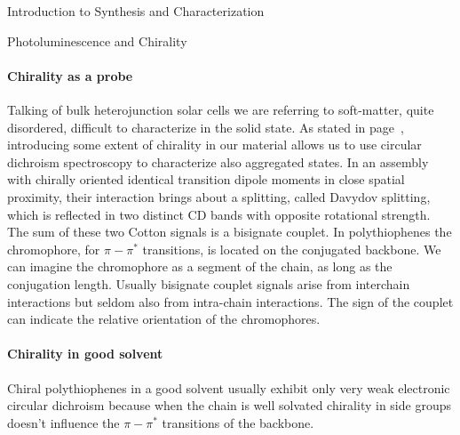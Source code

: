 \begin{section}{Introduction to Synthesis and Characterization}
\begin{subsection}{Photoluminescence and Chirality}
\paragraph{Chirality as a probe} Talking of bulk heterojunction solar cells we are referring to soft-matter, quite disordered, difficult to characterize in the solid state. As stated in page~\pageref{intro-cd}, introducing some extent of chirality in our material allows us to use circular dichroism spectroscopy to characterize also aggregated states. 
In an assembly with chirally oriented identical transition dipole moments in close spatial proximity, their interaction brings about a splitting, called Davydov splitting, %
which is reflected in two distinct \gls{CD} bands 
with opposite rotational strength. 
The sum of these two Cotton signals 
is a bisignate couplet. 
In polythiophenes the chromophore, for $\pi-\pi^*$ transitions, is located on the conjugated backbone. We can imagine the chromophore as a segment of the chain, as long as the conjugation length. Usually bisignate couplet signals arise from interchain interactions but seldom also from intra-chain interactions. The sign of the couplet can indicate the relative orientation of the chromophores. 

\paragraph{Chirality in good solvent} Chiral polythiophenes in a good solvent usually exhibit only very weak electronic circular dichroism because when the chain is well solvated chirality in side groups doesn't influence the $\pi-\pi^*$ transitions of the backbone. 


\end{subsection}
\end{section}
